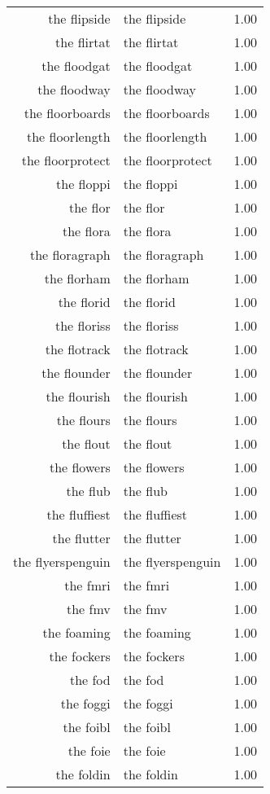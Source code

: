 \begin{table}[ht]
\begin{tabular}{rlr}
  the flipside & the flipside & 1.00 \\ 
  the flirtat & the flirtat & 1.00 \\ 
  the floodgat & the floodgat & 1.00 \\ 
  the floodway & the floodway & 1.00 \\ 
  the floorboards & the floorboards & 1.00 \\ 
  the floorlength & the floorlength & 1.00 \\ 
  the floorprotect & the floorprotect & 1.00 \\ 
  the floppi & the floppi & 1.00 \\ 
  the flor & the flor & 1.00 \\ 
  the flora & the flora & 1.00 \\ 
  the floragraph & the floragraph & 1.00 \\ 
  the florham & the florham & 1.00 \\ 
  the florid & the florid & 1.00 \\ 
  the floriss & the floriss & 1.00 \\ 
  the flotrack & the flotrack & 1.00 \\ 
  the flounder & the flounder & 1.00 \\ 
  the flourish & the flourish & 1.00 \\ 
  the flours & the flours & 1.00 \\ 
  the flout & the flout & 1.00 \\ 
  the flowers & the flowers & 1.00 \\ 
  the flub & the flub & 1.00 \\ 
  the fluffiest & the fluffiest & 1.00 \\ 
  the flutter & the flutter & 1.00 \\ 
  the flyerspenguin & the flyerspenguin & 1.00 \\ 
  the fmri & the fmri & 1.00 \\ 
  the fmv & the fmv & 1.00 \\ 
  the foaming & the foaming & 1.00 \\ 
  the fockers & the fockers & 1.00 \\ 
  the fod & the fod & 1.00 \\ 
  the foggi & the foggi & 1.00 \\ 
  the foibl & the foibl & 1.00 \\ 
  the foie & the foie & 1.00 \\ 
  the foldin & the foldin & 1.00 \\ 

\end{tabular}
\end{table}
